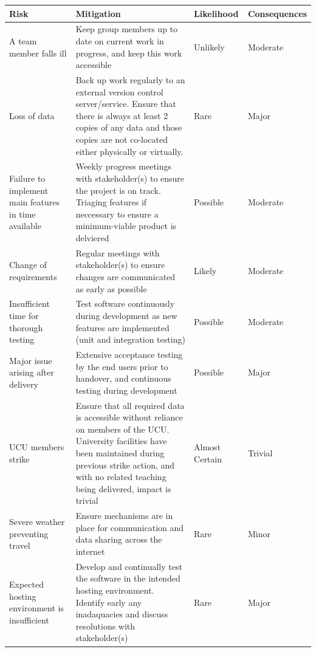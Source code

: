 \documentclass[11pt, a4paper]{article}
\begin{document}
\begin{landscape}
\begin{tabulary}{1.8\textwidth}{L|L|l|l}
	Risk & Mitigation & Likelihood & Consequences \\\toprule
	A team member falls ill & Keep group members up to date on current work in progress, and keep this work accessible & Unlikely & Moderate\\
	Loss of data & Back up work regularly to an external version control server/service. Ensure that there is always at least 2 copies of any data and those copies are not co-located either physically or virtually. & Rare & Major \\
	Failure to implement main features in time available & Weekly progress meetings with stakeholder(s) to ensure the project is on track. Triaging features if neccessary to ensure a minimum-viable product is delviered & Possible & Moderate \\
	Change of requirements & Regular meetings with stakeholder(s) to ensure changes are communicated as early as possible & Likely & Moderate \\
	Insufficient time for thorough testing & Test software continuously during development as new features are implemented (unit and integration testing) & Possible & Moderate \\
	Major issue arising after delivery & Extensive acceptance testing by the end users prior to handover, and continuous testing during development & Possible & Major \\
	UCU members strike & Ensure that all required data is accessible without reliance on members of the UCU. University facilities have been maintained during previous strike action, and with no related teaching being delivered, impact is trivial & Almost Certain & Trivial \\ 
	Severe weather preventing travel & Ensure mechanisms are in place for communication and data sharing across the internet & Rare & Minor \\
	Expected hosting environment is insufficient & Develop and continually test the software in the intended hosting environment. Identify early any inadaquacies and discuss resolutions with stakeholder(s) & Rare & Major \\

\end{tabulary}

\end{landscape}
\end{document}
